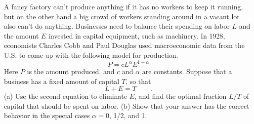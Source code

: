 A fancy factory can't produce anything if it has no workers
to keep it running, but on the other hand a big crowd of
workers standing around in a vacant lot also can't do anything.
Businesses need to balance their spending on labor $L$ and
the amount $E$ invested in capital equipment, such as machinery. In 1928, economists
Charles Cobb and Paul Douglas used macroeconomic data from
the U.S. to come up with the following model for production.
\begin{equation*}
  P = cL^\alpha E^{1-\alpha}
\end{equation*}
Here $P$ is the amount produced, and $c$ and $\alpha$ are constants.
Suppose that a business has a fixed amount of capital $T$, so that
\begin{equation*}
  L+E = T \qquad .
\end{equation*}
(a) Use the second equation to eliminate $E$, and find the optimal
fraction $L/T$ of capital that should be spent on labor.
(b) Show that your answer has the correct behavior in the special
cases $\alpha=0$, 1/2, and 1.\answercheck
